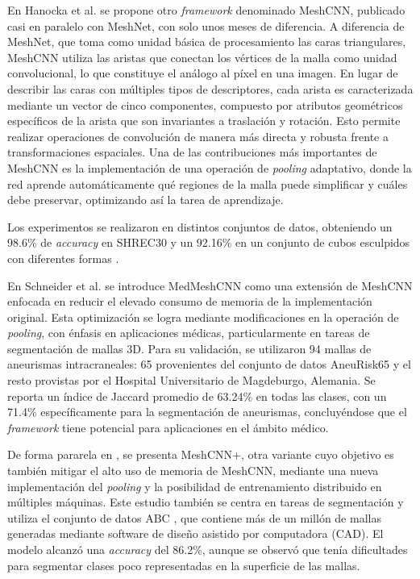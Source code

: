 En Hanocka et al. \cite{hanocka2019meshcnn} se propone otro \textit{framework} denominado MeshCNN, publicado casi en paralelo con MeshNet, con solo unos meses de diferencia. A diferencia de MeshNet, que toma como unidad básica de procesamiento las caras triangulares, MeshCNN utiliza las aristas que conectan los vértices de la malla como unidad convolucional, lo que constituye el análogo al píxel en una imagen. En lugar de describir las caras con múltiples tipos de descriptores, cada arista es caracterizada mediante un vector de cinco componentes, compuesto por atributos geométricos específicos de la arista que son invariantes a traslación y rotación. Esto permite realizar operaciones de convolución de manera más directa y robusta frente a transformaciones espaciales. Una de las contribuciones más importantes de MeshCNN es la implementación de una operación de \textit{pooling} adaptativo, donde la red aprende automáticamente qué regiones de la malla puede simplificar y cuáles debe preservar, optimizando así la tarea de aprendizaje.

Los experimentos se realizaron en distintos conjuntos de datos, obteniendo un 98.6\% de \textit{accuracy} en SHREC30 \cite{lian2011shape} y un 92.16\% en un conjunto de cubos esculpidos con diferentes formas \cite{latecki2000shape}.

En Schneider et al. \cite{schneider_medmeshcnn_2021} se introduce MedMeshCNN como una extensión de MeshCNN enfocada en reducir el elevado consumo de memoria de la implementación original. Esta optimización se logra mediante modificaciones en la operación de \textit{pooling}, con énfasis en aplicaciones médicas, particularmente en tareas de segmentación de mallas 3D. Para su validación, se utilizaron 94 mallas de aneurismas intracraneales: 65 provenientes del conjunto de datos AneuRisk65 \cite{sangalli2014aneurisk65} y el resto provistas por el Hospital Universitario de Magdeburgo, Alemania. Se reporta un índice de Jaccard promedio de 63.24\% en todas las clases, con un 71.4\% específicamente para la segmentación de aneurismas, concluyéndose que el \textit{framework} tiene potencial para aplicaciones en el ámbito médico.

De forma pararela en \cite{mandado_surface_2021}, se presenta MeshCNN+, otra variante cuyo objetivo es también mitigar el alto uso de memoria de MeshCNN, mediante una nueva implementación del \textit{pooling} y la posibilidad de entrenamiento distribuido en múltiples máquinas. Este estudio también se centra en tareas de segmentación y utiliza el conjunto de datos ABC \cite{Koch_2019_CVPR}, que contiene más de un millón de mallas generadas mediante software de diseño asistido por computadora (CAD). El modelo alcanzó una \textit{accuracy} del 86.2\%, aunque se observó que tenía dificultades para segmentar clases poco representadas en la superficie de las mallas.


